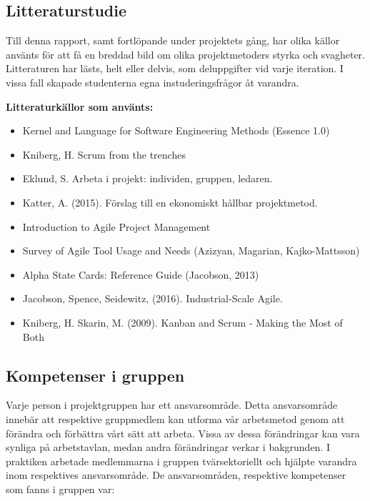 \documentclass[conference]{IEEEtran}
\begin{document}
\subsection{Litteraturstudie}
Till denna rapport, samt fortlöpande under projektets gång, har olika källor använts för att få en breddad bild om olika projektmetoders styrka och svagheter. Litteraturen har lästs, helt eller delvis, som deluppgifter vid varje iteration. I vissa fall skapade studenterna egna instuderingsfrågor åt varandra.

\textbf{Litteraturkällor som använts:}
\begin{itemize}
    \item Kernel and Language for Software Engineering Methods (Essence 1.0) \cite{object_management_group_kernel_2014}
    \item Kniberg, H. Scrum from the trenches \cite{kniberg_scrum_2015}
    \item Eklund, S.  Arbeta i projekt: individen, gruppen, ledaren. \cite{Eklund:2} 
    \item Katter, A. (2015). Förslag till en ekonomiskt hållbar projektmetod. \cite{Katter}
    \item Introduction to Agile Project Management \cite{IntroAgileProjMan}
    \item Survey of Agile Tool Usage and Needs (Azizyan, Magarian, Kajko-Mattsson) \cite{SurveyofAgileTool}
    \item Alpha State Cards: Reference Guide (Jacobson, 2013) \cite{AlphaStateCard}
    \item Jacobson, Spence, Seidewitz, (2016). Industrial-Scale Agile. \cite{IndustrialScaleAgile}
    \item Kniberg, H. Skarin, M. (2009). Kanban and Scrum - Making the Most of Both \cite{KanbanandScrum}
\end{itemize}

\subsection{Kompetenser i gruppen}
Varje person i projektgruppen har ett ansvarsområde. Detta ansvarsområde innebär att respektive gruppmedlem kan utforma vår arbetsmetod genom att förändra och förbättra vårt sätt att arbeta. Vissa av dessa förändringar kan vara synliga på arbetstavlan, medan andra förändringar verkar i bakgrunden. I praktiken arbetade medlemmarna i gruppen tvärsektoriellt och hjälpte varandra inom respektives ansvarsområde.
De ansvarsområden, respektive kompetenser som fanns i gruppen var:
\end{document}
